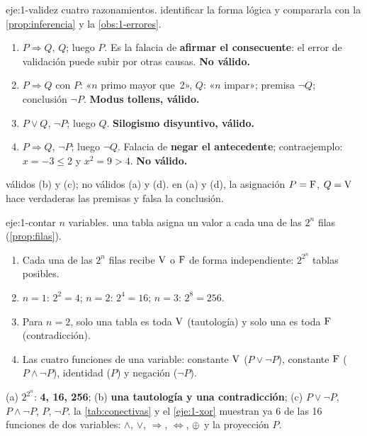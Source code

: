\begin{solucion}{eje:1-validez}
\datos cuatro razonamientos.
\planteamiento identificar la forma lógica y compararla con la \cref{prop:inferencia} y la \cref{obs:1-errores}.
\pasos
\begin{enumerate}[label=(\alph*)]
  \item $P\Rightarrow Q$, $Q$; luego $P$. Es la falacia de \textbf{afirmar el consecuente}: el error de validación puede subir por otras causas. \textbf{No válido.}
  \item $P\Rightarrow Q$ con $P$: «$n$ primo mayor que~2», $Q$: «$n$ impar»; premisa $\neg Q$; conclusión $\neg P$. \textbf{Modus tollens, válido.}
  \item $P\vee Q$, $\neg P$; luego $Q$. \textbf{Silogismo disyuntivo, válido.}
  \item $P\Rightarrow Q$, $\neg P$; luego $\neg Q$. Falacia de \textbf{negar el antecedente}; contraejemplo: $x=-3\le 2$ y $x^{2}=9>4$. \textbf{No válido.}
\end{enumerate}
\resultado válidos (b) y (c); no válidos (a) y (d).
\comprobacion en (a) y (d), la asignación $P=\mathrm{F}$, $Q=\mathrm{V}$ hace verdaderas las premisas y falsa la conclusión.
\end{solucion}

\begin{solucion}{eje:1-contar}
\datos $n$ variables.
\planteamiento una tabla asigna un valor a cada una de las $2^{n}$ filas (\cref{prop:filas}).
\pasos
\begin{enumerate}[label=\arabic*.]
  \item Cada una de las $2^{n}$ filas recibe $\mathrm{V}$ o $\mathrm{F}$ de forma independiente: $2^{2^{n}}$ tablas posibles.
  \item $n=1$: $2^{2}=4$; $n=2$: $2^{4}=16$; $n=3$: $2^{8}=256$.
  \item Para $n=2$, solo una tabla es toda $\mathrm{V}$ (tautología) y solo una es toda $\mathrm{F}$ (contradicción).
  \item Las cuatro funciones de una variable: constante $\mathrm{V}$ ($P\vee\neg P$), constante $\mathrm{F}$ ($P\wedge\neg P$), identidad ($P$) y negación ($\neg P$).
\end{enumerate}
\resultado (a) $2^{2^{n}}$: \textbf{4, 16, 256}; (b) \textbf{una tautología y una contradicción}; (c) $P\vee\neg P$, $P\wedge\neg P$, $P$, $\neg P$.
\comprobacion la \cref{tab:conectivas} y el \cref{eje:1-xor} muestran ya 6 de las 16 funciones de dos variables: $\wedge$, $\vee$, $\Rightarrow$, $\Leftrightarrow$, $\oplus$ y la proyección $P$.
\end{solucion}

